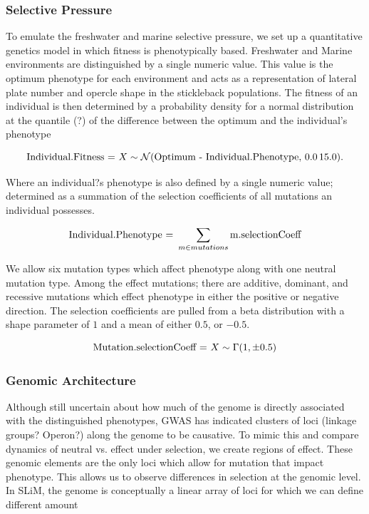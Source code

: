 \documentclass{article}
\begin{document}

\subsubsection{Selective Pressure}

To emulate the freshwater and marine selective pressure, 
we set up a quantitative genetics model in which fitness is phenotypically based. 
Freshwater and Marine environments are distinguished by a single numeric value. 
This value is the optimum phenotype for each environment
and acts as a representation of lateral plate number and opercle shape in the stickleback populations.
The fitness of an individual is then determined by a probability density for a normal distribution 
at the quantile (?) of the difference between the optimum and the individual's phenotype


    \[
\textnormal{Individual.Fitness = } X \sim \mathcal{N}(\textnormal{Optimum - Individual.Phenotype},\,0.0\,15.0).
    \]

Where an individual?s phenotype is also defined by a single numeric value; 
determined as a summation of the selection coefficients of all mutations an individual possesses. 

	\[
{\textnormal{Individual.Phenotype = } \sum_{m \in mutations} \textnormal{m.selectionCoeff}}
	\]
    
    
We allow six mutation types which affect phenotype along with one neutral mutation type.
Among the effect mutations; 
there are additive, dominant, and recessive mutations which effect phenotype
in either the positive or negative direction. 
The selection coefficients are pulled from a beta distribution 
with a shape parameter of $1$ and a mean of either $0.5$, or ${-0.5}$. 

	\[
\textnormal{Mutation.selectionCoeff = } X \sim \Gamma (1,\pm0.5)
	\]

\subsubsection{Genomic Architecture}

Although still uncertain about how much of the genome is directly associated with the distinguished phenotypes, 
GWAS has indicated clusters of loci (linkage groups? Operon?) along the genome to be causative. 
To mimic this and compare dynamics of neutral vs. effect under selection, 
we create regions of effect. These genomic elements are the only loci which allow for mutation that impact phenotype. 
This allows us to observe differences in selection at the genomic level. 
In SLiM, the genome is conceptually a linear array of loci for which we can define
different amount 
\end{document}
